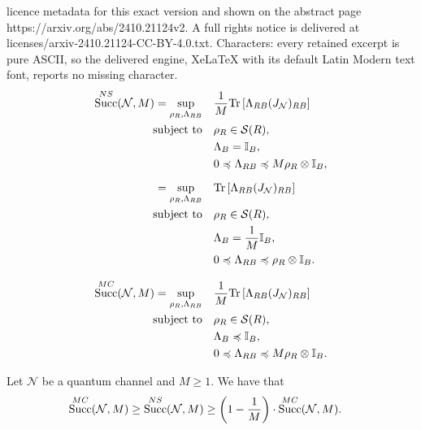 \documentclass[10pt,a4paper]{amsart}
\DeclareMathOperator{\suc}{Succ}
\newcommand*{\cN}{\mathcal{N}}
\newcommand*{\cS}{\mathcal{S}}
\newcommand*{\mle}{\preccurlyeq}
\newcommand*{\tr}[1]{\mathrm{Tr}\left[#1\right]}
\begin{document}
licence metadata for this exact version and shown on the abstract page https://arxiv.org/abs/2410.21124v2. A full rights notice is delivered at licenses/arxiv-2410.21124-CC-BY-4.0.txt. Characters: every retained excerpt is pure ASCII, so the delivered engine, XeLaTeX with its default Latin Modern text font, reports no missing character.
\begin{align}
\suc^{\rm{NS}}(\cN, M) = \sup_{\rho_R, \Lambda_{RB}} \quad & \frac{1}{M} \tr{\Lambda_{RB} (J_{\cN})_{RB}} \notag \\
\text{subject to} \quad
& \rho_R \in \cS(R), \notag \\
& \Lambda_B = \mathbb{I}_B, \notag \\
& 0 \mle \Lambda_{RB} \mle M \rho_R \otimes \mathbb{I}_B, \label{NS-program-pre}
\\[6pt]
= \sup_{\rho_R, \Lambda_{RB}} \quad & \tr{\Lambda_{RB} (J_{\cN})_{RB}} \notag \\
\text{subject to} \quad
& \rho_R \in \cS(R), \notag \\
& \Lambda_B = \frac{1}{M} \mathbb{I}_B, \notag \\
& 0 \mle \Lambda_{RB} \mle \rho_R \otimes \mathbb{I}_B. \label{NS-program}
\end{align}

\begin{align}
    \suc^{\rm{MC}}(\cN, M) = \sup_{\rho_R, \Lambda_{RB}} \quad & \frac{1}{M} \tr{\Lambda_{RB} (J_{\cN})_{RB}} \notag \\
\text{subject to} \quad
& \rho_R \in \cS(R), \notag \\
& \Lambda_B \mle  \mathbb{I}_B, \notag \\
& 0 \mle \Lambda_{RB} \mle M \rho_R \otimes \mathbb{I}_B.\label{MC-program}
\end{align}

\begin{prop}\label{prop:NSvsMC}
Let $\cN$ be a quantum channel and $M\ge 1$. 
    We have that 
    \begin{align}
        \suc^{\rm{MC}}(\cN,M)&\ge  \suc^{\rm{NS}}(\cN,M) 
        \ge \left(1-\frac{1}{M}\right)\cdot \suc^{\rm{MC}}(\cN,M).
    \end{align}
\end{prop}
\end{document}
